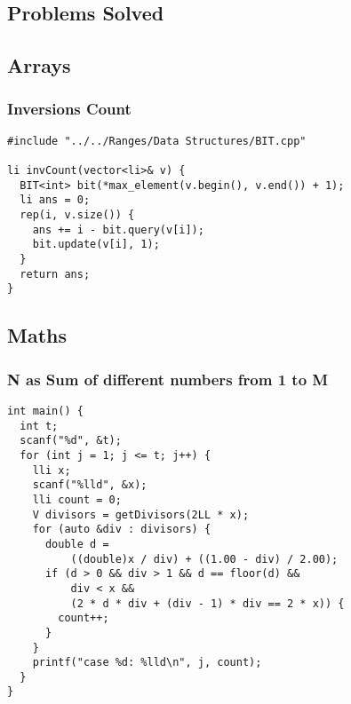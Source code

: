 \documentclass[twoside]{article}
\begin{document}
\begin{multicols*}{2}
\sectionfont{\bfseries\sffamily\centering\Huge}
\vspace{1em}
\section*{Problems Solved}
\vspace{3em}
\subsectionfont{\bfseries\sffamily\centering\LARGE}
\vspace{0em}
\subsection*{Arrays}
\vspace{2em}
\subsubsectionfont{\large\bfseries\sffamily\underline}
\subsubsection*{Inversions Count}
\begin{verbatim}
#include "../../Ranges/Data Structures/BIT.cpp"

li invCount(vector<li>& v) {
  BIT<int> bit(*max_element(v.begin(), v.end()) + 1);
  li ans = 0;
  rep(i, v.size()) {
    ans += i - bit.query(v[i]);
    bit.update(v[i], 1);
  }
  return ans;
}
\end{verbatim}

\subsectionfont{\bfseries\sffamily\centering\LARGE}
\vspace{0em}
\subsection*{Maths}
\vspace{2em}
\subsubsectionfont{\large\bfseries\sffamily\underline}
\subsubsection*{N as Sum of different numbers from 1 to M}
\begin{verbatim}
int main() {
  int t;
  scanf("%d", &t);
  for (int j = 1; j <= t; j++) {
    lli x;
    scanf("%lld", &x);
    lli count = 0;
    V divisors = getDivisors(2LL * x);
    for (auto &div : divisors) {
      double d =
          ((double)x / div) + ((1.00 - div) / 2.00);
      if (d > 0 && div > 1 && d == floor(d) &&
          div < x &&
          (2 * d * div + (div - 1) * div == 2 * x)) {
        count++;
      }
    }
    printf("case %d: %lld\n", j, count);
  }
}
\end{verbatim}


\end{multicols*}
\end{document}
